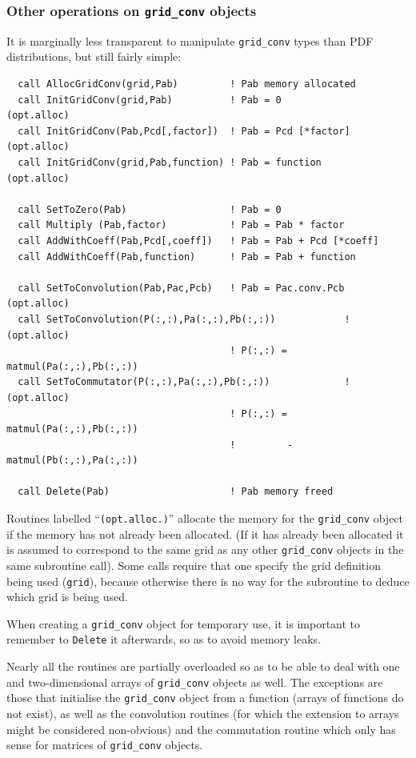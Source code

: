 \documentclass[12pt]{article}
\begin{document}
\subsubsection{Other operations on \texttt{grid\_conv} objects}
\label{sec:other_grid_conv_ops}
%
It is marginally less transparent to manipulate \texttt{grid\_conv} types
than PDF distributions, but still fairly simple:
\begin{lstlisting}
  call AllocGridConv(grid,Pab)         ! Pab memory allocated 
  call InitGridConv(grid,Pab)          ! Pab = 0             (opt.alloc)
  call InitGridConv(Pab,Pcd[,factor])  ! Pab = Pcd [*factor] (opt.alloc)
  call InitGridConv(grid,Pab,function) ! Pab = function      (opt.alloc)

  call SetToZero(Pab)                  ! Pab = 0
  call Multiply (Pab,factor)           ! Pab = Pab * factor
  call AddWithCoeff(Pab,Pcd[,coeff])   ! Pab = Pab + Pcd [*coeff]
  call AddWithCoeff(Pab,function)      ! Pab = Pab + function

  call SetToConvolution(Pab,Pac,Pcb)   ! Pab = Pac.conv.Pcb  (opt.alloc)
  call SetToConvolution(P(:,:),Pa(:,:),Pb(:,:))            ! (opt.alloc)
                                       ! P(:,:) = matmul(Pa(:,:),Pb(:,:))
  call SetToCommutator(P(:,:),Pa(:,:),Pb(:,:))             ! (opt.alloc)
                                       ! P(:,:) = matmul(Pa(:,:),Pb(:,:))
                                       !         -matmul(Pb(:,:),Pa(:,:))    

  call Delete(Pab)                     ! Pab memory freed
\end{lstlisting}
Routines labelled ``\texttt{(opt.alloc.)}'' allocate the memory for
the \texttt{grid\_conv} object if the memory has not already been
allocated. (If it has already been allocated it is assumed to
correspond to the same grid as any other \texttt{grid\_conv} objects
in the same subroutine call). Some calls require that one specify the
grid definition being used (\texttt{grid}), because otherwise there is
no way for the subroutine to deduce which grid is being used.

When creating a \texttt{grid\_conv} object for temporary use, it is
important to remember to \texttt{Delete} it afterwards, so as to avoid
memory leaks.

Nearly all the routines are partially overloaded so as to be able to
deal with one and two-dimensional arrays of \texttt{grid\_conv}
objects as well. The exceptions are those that initialise the
\texttt{grid\_conv} object from a function (arrays of functions do not
exist), as well as the convolution routines (for which the extension
to arrays might be considered non-obvious) and the commutation routine
which only has sense for matrices of \texttt{grid\_conv} objects.
\end{document}
